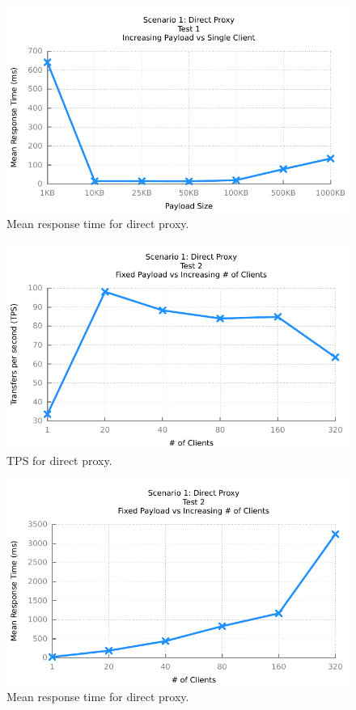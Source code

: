 \begin{figure}
	\centerline{\includegraphics{img/proxy_fu_ip_resp}}
	\caption{Mean response time for direct proxy.}
	\label{fig:proxy-1-2}
\end{figure}

\begin{figure}
	\centerline{\includegraphics{img/proxy_fp_iu_tps}}
	\caption{TPS for direct proxy.}
	\label{fig:proxy-2-1}
\end{figure}

\begin{figure}
	\centerline{\includegraphics{img/proxy_fp_iu_resp}}
	\caption{Mean response time for direct proxy.}
	\label{fig:proxy-2-2}
\end{figure}

